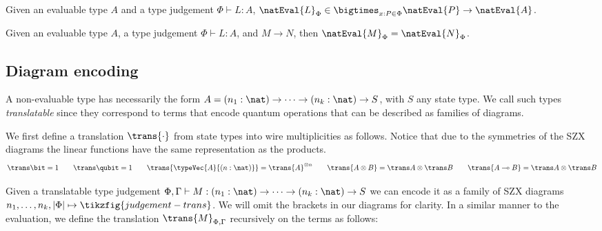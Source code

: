 \begin{lemma}%
    \label{lem:eval-type}
    Given an evaluable type $A$ and a type judgement $\Phi \vdash L : A$,
    $\natEval{L}_\Phi \in \bigtimes_{x:P \in \Phi} \natEval{P} \to \natEval{A}$.
\end{lemma}

\begin{lemma}%
    \label{lem:eval-reduction}
    Given an evaluable type $A$,
    a type judgement $\Phi \vdash L : A$, and $M \to N$, then $\natEval{M}_\Phi = \natEval{N}_\Phi$.
\end{lemma}

\subsection{Diagram encoding}

A non-evaluable type has necessarily the form $A = (n_1:\nat) \to \dots \to (n_k:\nat) \to S$,
with $S$ any state type.
We call such types \textit{translatable} since they correspond to terms that
encode quantum operations that can be described as families of diagrams.

We first define a translation $\trans{\cdot}$ from state types
into wire multiplicities as follows.
Notice that due to the symmetries of the SZX diagrams
the linear functions have the same representation as the products.
\[
    \trans\bit = 1
    \qquad
    \trans\qubit = 1
    \qquad
    \trans{\typeVec{A}{(n: \nat)}} = \trans{A}^{\otimes n}
    \qquad
    \trans{A \otimes B} = \trans A \otimes \trans B
    \qquad
    \trans{A \multimap B} = \trans A \otimes \trans B
\]

Given a translatable type judgement
$\Phi, \Gamma \vdash M : (n_1:\nat) \to \dots \to (n_k:\nat) \to S$
we can encode it as a family of SZX diagrams
\(
  n_1, \dots, n_k, |\Phi| \mapsto \tikzfig{judgement-trans}
\).
We will omit the brackets in our diagrams for clarity.
In a similar manner to the evaluation, we define
the translation $\trans{M}_{\Phi,\Gamma}$
recursively on the terms as follows: 

